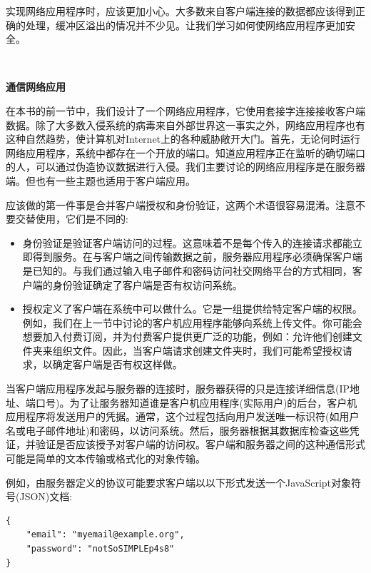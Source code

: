 实现网络应用程序时，应该更加小心。大多数来自客户端连接的数据都应该得到正确的处理，缓冲区溢出的情况并不少见。让我们学习如何使网络应用程序更加安全。 \par

\noindent\textbf{}\ \par
\textbf{通信网络应用} \ \par
在本书的前一节中，我们设计了一个网络应用程序，它使用套接字连接接收客户端数据。除了大多数入侵系统的病毒来自外部世界这一事实之外，网络应用程序也有这种自然趋势，使计算机对Internet上的各种威胁敞开大门。首先，无论何时运行网络应用程序，系统中都存在一个开放的端口。知道应用程序正在监听的确切端口的人，可以通过伪造协议数据进行入侵。我们主要讨论的网络应用程序是在服务器端。但也有一些主题也适用于客户端应用。 \par
应该做的第一件事是合并客户端授权和身份验证，这两个术语很容易混淆。注意不要交替使用，它们是不同的: \par

\begin{itemize}
	\item 身份验证是验证客户端访问的过程。这意味着不是每个传入的连接请求都能立即得到服务。在与客户端之间传输数据之前，服务器应用程序必须确保客户端是已知的。与我们通过输入电子邮件和密码访问社交网络平台的方式相同，客户端的身份验证确定了客户端是否有权访问系统。
	\item 授权定义了客户端在系统中可以做什么。它是一组提供给特定客户端的权限。例如，我们在上一节中讨论的客户机应用程序能够向系统上传文件。你可能会想要加入付费订阅，并为付费客户提供更广泛的功能，例如：允许他们创建文件夹来组织文件。因此，当客户端请求创建文件夹时，我们可能希望授权请求，以确定客户端是否有权这样做。
\end{itemize}

当客户端应用程序发起与服务器的连接时，服务器获得的只是连接详细信息(IP地址、端口号)。为了让服务器知道谁是客户机应用程序(实际用户)的后台，客户机应用程序将发送用户的凭据。通常，这个过程包括向用户发送唯一标识符(如用户名或电子邮件地址)和密码，以访问系统。然后，服务器根据其数据库检查这些凭证，并验证是否应该授予对客户端的访问权。客户端和服务器之间的这种通信形式可能是简单的文本传输或格式化的对象传输。 \par
例如，由服务器定义的协议可能要求客户端以以下形式发送一个JavaScript对象符号(JSON)文档: \par

\begin{lstlisting}[caption={}]
{
	"email": "myemail@example.org",
	"password": "notSoSIMPLEp4s8"
}
\end{lstlisting}

